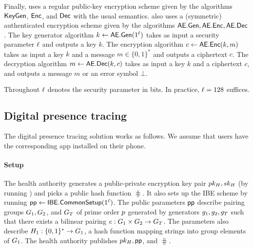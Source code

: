 Finally, \name uses a regular public-key encryption scheme given by the algorithms $\textsf{KeyGen}$, $\textsf{Enc}$, and $\textsf{Dec}$ with the usual semantics. \name also uses a (symmetric) authenticated encryption scheme given by the algorithms $\textsf{AE.Gen},\allowbreak \textsf{AE.Enc}, \allowbreak \textsf{AE.Dec}$. The key generator algorithm $k \gets \textsf{AE.Gen}(1^\ell)$ takes as input a security parameter $\ell$ and outputs a key $k$. The encryption algorithm $c \gets \textsf{AE.Enc}(k, m)$ takes as input a key $k$ and a message $m \in \{0, 1\}^*$ and outputs a ciphertext $c$. The decryption algorithm $m \gets \textsf{AE.Dec}(k, c)$ takes as input a key $k$ and a ciphertext $c$, and outputs a message $m$ or an error symbol $\bot$.

Throughout $\ell$ denotes the security parameter in bits. In practice, $\ell = 128$ suffices.

\subsection{Digital presence tracing}

The digital presence tracing solution works as follows. We assume that users have the corresponding app installed on their phone.

\paragraph{Setup} The health authority generates a public-private encryption key pair $pk_{H}, sk_{H}$ (by running \keygen) and picks a public hash function $\hash$. It also sets up the IBE scheme by running $\textsf{pp} \gets \textsf{IBE.CommonSetup}(1^\ell)$. The public parameters $\textsf{pp}$ describe pairing groups
$G_1, G_2$, and $G_T$ of prime order $p$ generated by generators $g_1, g_2, g_T$ such that there exists a bilinear pairing $e: G_1 \times G_2 \to G_T$. The parameters also describe $H_1 : \{0,1\}^* \to G_1$, a hash function mapping strings into group elements of $G_1$. The health authority publishes $pk_{H}, \textsf{pp}$, and $\hash$.

